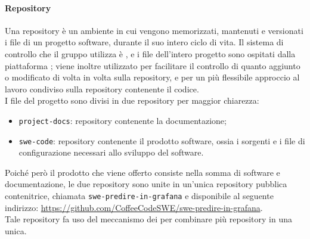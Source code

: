 \documentclass[../norme-di-progetto.tex]{subfiles}
\begin{document}
\paragraph{Repository}
Una repository è un ambiente in cui vengono memorizzati, mantenuti e versionati i file di un progetto software, durante il suo intero ciclo di vita. Il sistema di controllo che il gruppo utilizza è , e i file dell'intero progetto sono ospitati dalla piattaforma ; viene inoltre utilizzato  per facilitare il controllo di quanto aggiunto o modificato di volta in volta sulla repository, e  per un più flessibile approccio al lavoro condiviso sulla repository contenente il codice. \\
I file del progetto sono divisi in due repository per maggior chiarezza:
\begin{itemize}
  \item \texttt{project-docs}: repository contenente la documentazione;
  \item \texttt{swe-code}: repository contenente il prodotto software, ossia i sorgenti e i file di configurazione necessari allo sviluppo del software.
\end{itemize}
Poiché però il prodotto che viene offerto consiste nella somma di software e documentazione, le due repository sono unite in un'unica repository pubblica contenitrice, chiamata \texttt{swe-predire-in-grafana} e disponibile al seguente indirizzo: \href{https://github.com/CoffeeCodeSWE/swe-predire-in-grafana}{https://github.com/CoffeeCodeSWE/swe-predire-in-grafana}. \\
Tale repository fa uso del meccanismo dei  per combinare più repository in una unica.
\end{document}
